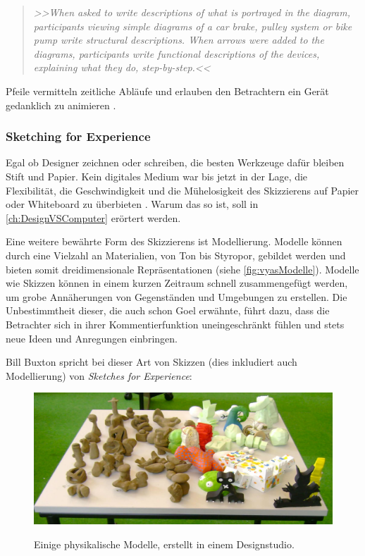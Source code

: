 \begin{quote}
	\textsl{>>When asked to write descriptions of what is portrayed in the diagram, participants viewing simple diagrams of a car brake, pulley system or bike pump write structural descriptions. When arrows were added to the diagrams, participants write functional descriptions of the devices, explaining what they do, step-by-step.<<}
\begin{flushright}\citep{Tversky:2002}\end{flushright}
\end{quote}

Pfeile vermitteln zeitliche Abläufe und erlauben den Betrachtern ein Gerät gedanklich zu animieren \citep{Hegarty:1992}.

\subsubsection{Sketching for Experience} 

Egal ob Designer zeichnen oder schreiben, die besten Werkzeuge dafür bleiben Stift und Papier. Kein digitales Medium war bis jetzt in der Lage, die Flexibilität, die Geschwindigkeit und die Mühelosigkeit des Skizzierens auf Papier oder Whiteboard zu überbieten \citep{Sagmeister:2008}. Warum das so ist, soll in \autoref{ch:DesignVSComputer} erörtert werden.

\medskip Eine weitere bewährte Form des Skizzierens ist Modellierung. Modelle können durch eine Vielzahl an Materialien, von Ton bis Styropor, gebildet werden und bieten somit dreidimensionale Repräsentationen (siehe \autoref{fig:vyasModelle}). Modelle wie Skizzen können in einem kurzen Zeitraum schnell zusammengefügt werden, um grobe Annäherungen von Gegenständen und Umgebungen zu erstellen. Die Unbestimmtheit dieser, die auch schon Goel erwähnte, führt dazu, dass die Betrachter sich in ihrer Kommentierfunktion uneingeschränkt fühlen und stets neue Ideen und Anregungen einbringen.

\medskip Bill Buxton spricht bei dieser Art von Skizzen (dies inkludiert auch Modellierung) von \emph{Sketches for Experience}: 
\begin{figure}
	\begin{center}
        {\includegraphics[width=\linewidth]{gfx/vyasModelle}}
	\end{center}
		\caption[Physikalische Modelle. \newline \citep{Vyas:2008}]{Einige physikalische Modelle, erstellt in einem Designstudio.}\label{fig:vyasModelle}
\end{figure}

